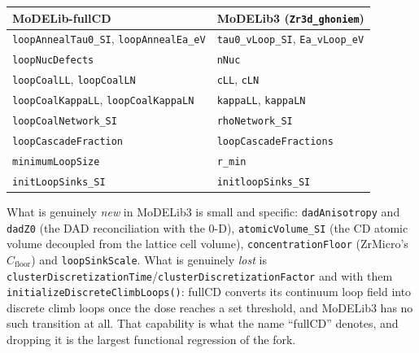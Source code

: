 \documentclass[11pt,a4paper]{article}
\newcommand{\code}[1]{\texttt{\small #1}}
\begin{document}
\begin{center}
\begin{tabular}{ll}
\toprule
MoDELib-fullCD & MoDELib3 (\code{Zr3d\_ghoniem}) \\
\midrule
\code{loopAnnealTau0\_SI}, \code{loopAnnealEa\_eV} & \code{tau0\_vLoop\_SI}, \code{Ea\_vLoop\_eV} \\
\code{loopNucDefects}      & \code{nNuc} \\
\code{loopCoalLL}, \code{loopCoalLN} & \code{cLL}, \code{cLN} \\
\code{loopCoalKappaLL}, \code{loopCoalKappaLN} & \code{kappaLL}, \code{kappaLN} \\
\code{loopCoalNetwork\_SI} & \code{rhoNetwork\_SI} \\
\code{loopCascadeFraction} & \code{loopCascadeFractions} \\
\code{minimumLoopSize}     & \code{r\_min} \\
\code{initLoopSinks\_SI}   & \code{initloopSinks\_SI} \\
\bottomrule
\end{tabular}
\end{center}

\noindent
What is genuinely \emph{new} in MoDELib3 is small and specific:
\code{dadAnisotropy} and \code{dadZ0} (the DAD reconciliation with the 0-D),
\code{atomicVolume\_SI} (the CD atomic volume decoupled from the lattice cell
volume), \code{concentrationFloor} (ZrMicro's $C_{\mathrm{floor}}$) and
\code{loopSinkScale}. What is genuinely \emph{lost} is
\code{clusterDiscretizationTime}/\code{clusterDiscretizationFactor} and with them
\code{initializeDiscreteClimbLoops()}: fullCD converts its continuum loop field
into discrete climb loops once the dose reaches a set threshold, and MoDELib3
has no such transition at all. That capability is what the name ``fullCD''
denotes, and dropping it is the largest functional regression of the fork.
\end{document}
